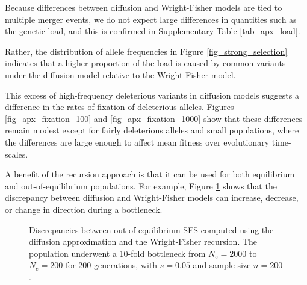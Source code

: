 \documentclass[9pt,twocolumn,twoside,lineno]{gsajnl}
\begin{document}
Because differences between diffusion and Wright-Fisher models are tied to multiple merger events, 
we do not expect large differences in quantities such as the genetic load, and this is confirmed
in Supplementary Table \ref{tab_apx_load}. 

Rather, the distribution of allele frequencies in Figure \ref{fig_strong_selection}
 indicates that a higher proportion of the load is caused by common variants  
 under the diffusion model relative to the Wright-Fisher model. 




This excess of high-frequency deleterious variants in diffusion models suggests a difference 
in the rates of fixation of deleterious alleles. 
Figures \ref{fig_apx_fixation_100} and \ref{fig_apx_fixation_1000} show that these differences 
remain modest except for fairly deleterious alleles and small populations,
where the differences are large enough to affect mean fitness over evolutionary time-scales. 

A benefit of the recursion approach is that it can be used for both equilibrium and out-of-equilibrium populations. For example, Figure \ref{ooe} shows that the discrepancy between diffusion and Wright-Fisher models can increase, decrease, or change in direction during a bottleneck. 

\begin{figure}
\caption{\label{ooe} Discrepancies between out-of-equilibrium SFS computed using the diffusion approximation and the Wright-Fisher recursion. The population underwent a 10-fold bottleneck from $N_e=2000$ to $N_e=200$ for 200 generations, with $s=0.05$ and sample size $n=200$. }
\end{figure}
\end{document}
